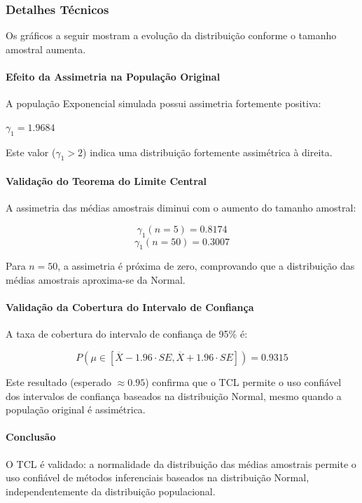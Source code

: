 \subsubsection{Detalhes Técnicos}

Os gráficos a seguir mostram a evolução da distribuição conforme o tamanho amostral aumenta.

\paragraph{Efeito da Assimetria na População Original}
A população Exponencial simulada possui assimetria fortemente positiva:

$\gamma_1 = 1.9684$

Este valor ($\gamma_1 > 2$) indica uma distribuição fortemente assimétrica à direita.

\paragraph{Validação do Teorema do Limite Central}
A assimetria das médias amostrais diminui com o aumento do tamanho amostral:

$$\gamma_1(n=5) = 0.8174$$
$$\gamma_1(n=50) = 0.3007$$

Para $n=50$, a assimetria é próxima de zero, comprovando que a distribuição das médias amostrais aproxima-se da Normal.

\paragraph{Validação da Cobertura do Intervalo de Confiança}
A taxa de cobertura do intervalo de confiança de 95\% é:

$$P(\mu \in [\overline{X} - 1.96 \cdot SE, \overline{X} + 1.96 \cdot SE]) = 0.9315$$

Este resultado (esperado $\approx 0.95$) confirma que o TCL permite o uso confiável dos intervalos de confiança baseados na distribuição Normal, mesmo quando a população original é assimétrica.

\paragraph{Conclusão}
O TCL é validado: a normalidade da distribuição das médias amostrais permite o uso confiável de métodos inferenciais baseados na distribuição Normal, independentemente da distribuição populacional.

